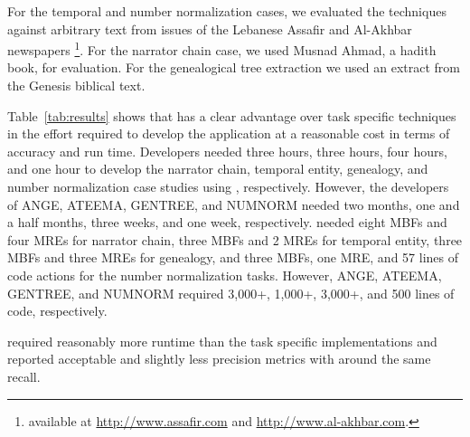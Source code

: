
For the temporal and number normalization cases, 
we evaluated the techniques against arbitrary text from issues of 
the Lebanese Assafir and Al-Akhbar newspapers
\footnote{available at \url{http://www.assafir.com} and 
\url{http://www.al-akhbar.com}.}. 
For the narrator chain case, we used
Musnad Ahmad, a hadith book, for evaluation. 
For the genealogical tree extraction we used 
an extract from the Genesis biblical text.

Table~\ref{tab:results} shows that \framework has a clear advantage over 
task specific techniques in the effort required to develop the application at 
a reasonable cost in terms of accuracy and run time. 
Developers needed three hours, three hours, four hours, and one hour 
to develop the narrator chain, temporal entity, genealogy, and number 
normalization case studies using \framework, respectively. 
However, the developers of ANGE, ATEEMA, GENTREE, and 
NUMNORM needed two months, one and a half months, 
three weeks, and one week, respectively. 
\framework needed eight MBFs and four MREs for narrator chain, 
three MBFs and 2 MREs for temporal entity, three MBFs and three MREs for 
genealogy, and three MBFs, one MRE, and 57 lines of code actions for the number normalization tasks. 
However, ANGE, ATEEMA, GENTREE, and NUMNORM required 
3,000+, 1,000+, 3,000+, and 500 lines of code, respectively.

\framework required reasonably more runtime than the task specific 
implementations and reported acceptable and 
slightly less precision metrics with around
the same recall.

